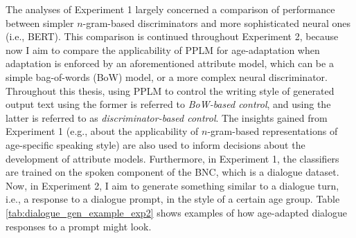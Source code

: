The analyses of Experiment 1 largely concerned a comparison of performance between simpler $n$-gram-based discriminators and more sophisticated neural ones (i.e., BERT). This comparison is continued throughout Experiment 2, because now I aim to compare the applicability of PPLM for age-adaptation when adaptation is enforced by an aforementioned attribute model, which can be a simple bag-of-words (BoW) model, or a more complex neural discriminator. Throughout this thesis, using PPLM to control the writing style of generated output text using the former is referred to \textit{BoW-based control}, and using the latter is referred to as \textit{discriminator-based control}. The insights gained from Experiment 1 (e.g., about the applicability of $n$-gram-based representations of age-specific speaking style) are also used to inform decisions about the development of attribute models. Furthermore, in Experiment 1, the classifiers are trained on the spoken component of the BNC, which is a dialogue dataset. Now, in Experiment 2, I aim to generate something similar to a dialogue turn, i.e., a response to a dialogue prompt, in the style of a certain age group. Table \ref{tab:dialogue_gen_example_exp2} shows examples of how age-adapted dialogue responses to a prompt might look.

